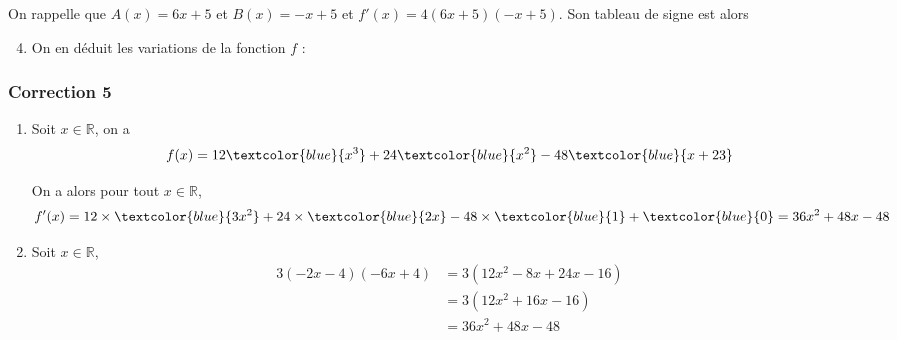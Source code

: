 \documentclass[15pt, mathserif]{beamer}
\newcommand{\R}{\mathbb{R}}			%
\begin{document}
\begin{frame}On rappelle que $A(x) = 6x+5$ et $B(x) = -x+5$ et $f'(x) = 4(6x+5)(-x+5)$. Son tableau de signe est alors 

\medskip \hfil
{}

 \begin{enumerate} 
 \setcounter{enumi}{3} 
 	 \item On en déduit les variations de la fonction $f$ : 

  \medskip \hfil
{}

 \end{enumerate} 
 
\end{frame}


\begin{frame}
\vspace{-10mm}
	\frametitle{Correction 5}
\begin{enumerate} 
 	 \item Soit $x \in \R$, on a $$f(x)=12\textcolor{blue}{x^3}+24\textcolor{blue}{x^2}-48\textcolor{blue}{x+23}$$
 
 On a alors pour tout $x \in  \R$, $$f'(x)= 12\times \textcolor{blue}{3x^2} +24\times \textcolor{blue}{2x}-48\times \textcolor{blue}{1}+\textcolor{blue}{0}=36x^2+48x-48$$
 	 \item Soit $x \in \R$, \begin{align*} 
 3(-2x-4)(-6x+4) & = 3\left( 12x^2 -8x +24x -16\right) \\ 
 &=  3\left( 12x^2 +16x -16\right) \\ 
 &= 36x^2 +48x -48
 \end{align*} \end{enumerate} 
 
 \end{frame} 
 
\end{document}
